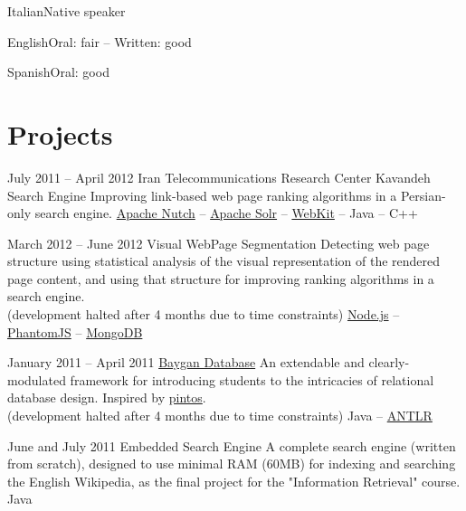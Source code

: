 \documentclass{tccv}
\begin{document}
\begin{factlist}
\item{Italian}{Native speaker}
\item{English}{Oral: fair -- Written: good}
\item{Spanish}{Oral: good}
\end{factlist}







\section{Projects}

\begin{project_list}

\item{July 2011 -- April 2012}
     {Iran Telecommunications Research Center}
     {Kavandeh Search Engine}
	 {Improving link-based web page ranking algorithms in a Persian-only search engine.}
     {\href{http://nutch.apache.org}{Apache Nutch} -- \href{http://lucene.apache.org/solr/}{Apache Solr} -- \href{http://www.webkit.org}{WebKit} -- Java -- C++}

\item{March 2012 -- June 2012}
     {}
     {Visual WebPage Segmentation}
	 {Detecting web page structure using statistical analysis of the visual representation of the rendered page content, and using that structure for improving ranking algorithms in a search engine.\\
(development halted after 4 months due to time constraints)}
	 {\href{http://nodejs.org}{Node.js} -- \href{http://phantomjs.org}{PhantomJS} -- \href{http://www.mongodb.org}{MongoDB}}

\item{January 2011 -- April 2011}
	 {}
	 {\href{https://github.com/baygan/Baygan}{Baygan Database}}
	 {An extendable and clearly-modulated framework for introducing students to the intricacies of relational database design. Inspired by \href{http://www.stanford.edu/class/cs140/projects/pintos/pintos.html}{pintos}.\\
(development halted after 4 months due to time constraints)}
	 {Java -- \href{http://www.antlr.org}{ANTLR}}
	 
\item{June and July 2011}
	 {}
	 {Embedded Search Engine}
	 {A complete search engine (written from scratch), designed to use minimal RAM (60MB) for indexing and searching the English Wikipedia, as the final project for the "Information Retrieval" course.}
	 {Java}


\end{project_list}
\end{document}
